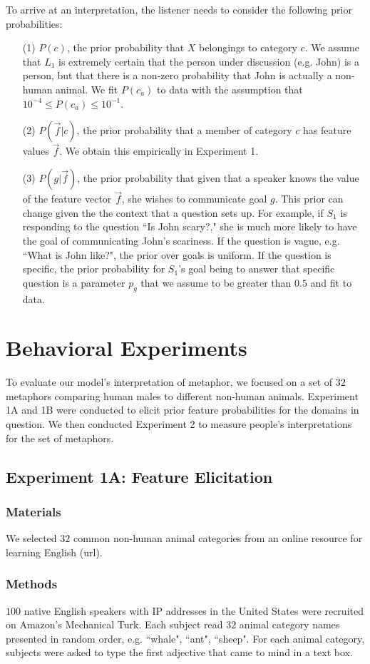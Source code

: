 \documentclass[10pt,letterpaper]{article}
\begin{document}
To arrive at an interpretation, the listener needs to consider the following prior probabilities: 
\begin{itemize}
\item[(1)] $P(c)$, the prior probability that $X$ belongings to category $c$. We assume that $L_1$ is extremely certain that the person under discussion (e.g. John) is a person, but that there is a non-zero probability that John is actually a non-human animal. We fit $P(c_a)$ to data with the assumption that $10^{-4} \leq P(c_a) \leq 10^{-1}$.
\item[(2)] $P(\vec f | c)$, the prior probability that a member of category $c$ has feature values $\vec f$. We obtain this empirically in Experiment 1.
\item[(3)] $P(g | \vec f)$, the prior probability that given that a speaker knows the value of the feature vector $\vec f$, she wishes to communicate goal $g$. This prior can change given the the context that a question sets up. For example,  if $S_1$ is responding to the question ``Is John scary?," she is much more likely to have the goal of communicating John's scariness. If the question is vague, e.g. ``What is John like?", the prior over goals is uniform. If the question is specific, the prior probability for $S_1$'s goal being to answer that specific question is a parameter $p_g$ that we assume to be greater than $0.5$ and fit to data.
\end{itemize}


\section{Behavioral Experiments}
To evaluate our model's interpretation of metaphor, we focused on a set of $32$ metaphors comparing human males to different non-human animals. Experiment 1A and 1B were conducted to elicit prior feature probabilities for the domains in question. We then conducted Experiment 2 to measure people's interpretations for the set of metaphors. 

\subsection{Experiment 1A: Feature Elicitation}
\subsubsection{Materials}
We selected $32$ common non-human animal categories from an online resource for learning English (url). 
\subsubsection{Methods}
$100$ native English speakers with IP addresses in the United States were recruited on Amazon's Mechanical Turk. Each subject read $32$ animal category names presented in random order, e.g. ``whale", ``ant", ``sheep". For each animal category, subjects were asked to type the first adjective that came to mind in a text box. 
\end{document}
